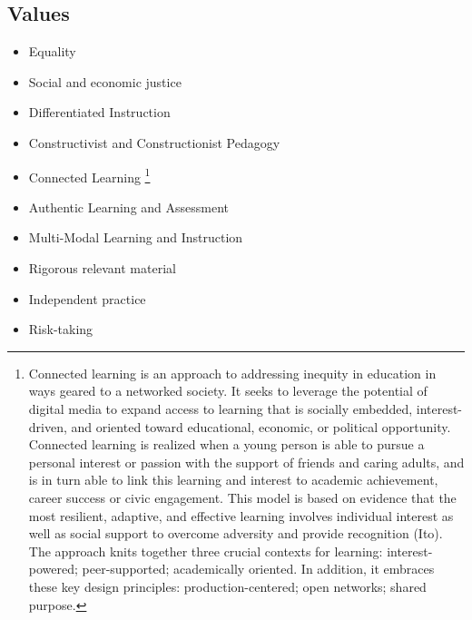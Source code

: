 \documentclass[letterpaper,10pt,english]{sphinxmanual}
\begin{document}
\subsection{Values}
\label{philosophy:id1}\begin{itemize}
\item {} 
Equality

\item {} 
Social and economic justice

\item {} 
Differentiated Instruction

\item {} 
Constructivist and Constructionist Pedagogy

\item {} 
Connected Learning \footnote{
Connected learning is an approach to addressing inequity in education in ways geared to a networked society. It seeks to leverage the potential of digital media to expand access to learning that is socially embedded, interest-driven, and oriented toward educational, economic, or political opportunity. Connected learning is realized when a young person is able to pursue a personal interest or passion with the support of friends and caring adults, and is in turn able to link this learning and interest to academic achievement, career success or civic engagement. This model is based on evidence that the most resilient, adaptive, and effective learning involves individual interest as well as social support to overcome adversity and provide recognition (Ito).  The approach knits together three crucial contexts for learning: interest-powered; peer-supported; academically oriented. In addition, it embraces these key design principles: production-centered; open networks; shared purpose.
}

\item {} 
Authentic Learning and Assessment

\item {} 
Multi-Modal Learning and Instruction

\item {} 
Rigorous relevant material

\item {} 
Independent practice

\item {} 
Risk-taking

\end{itemize}
\end{document}
